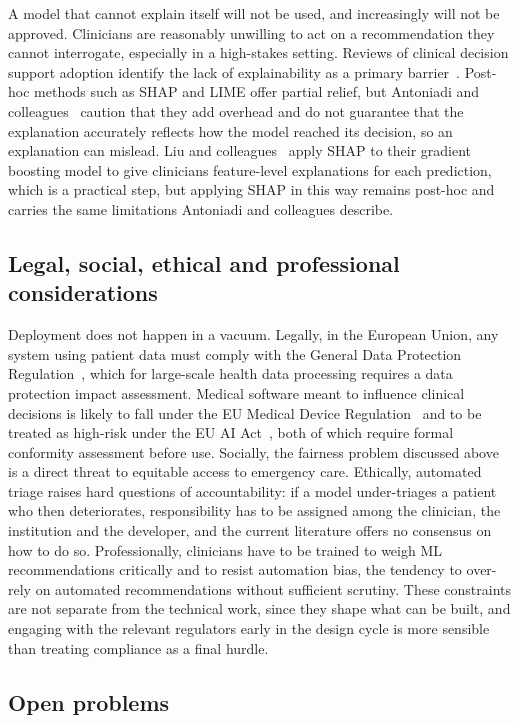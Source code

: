 \documentclass[11pt]{article}
\begin{document}
A model that cannot explain itself will not be used, and increasingly will not be approved. Clinicians are reasonably unwilling to act on a recommendation they cannot interrogate, especially in a high-stakes setting. Reviews of clinical decision support adoption identify the lack of explainability as a primary barrier~\cite{Antoniadi}. Post-hoc methods such as SHAP and LIME offer partial relief, but Antoniadi and colleagues~\cite{Antoniadi} caution that they add overhead and do not guarantee that the explanation accurately reflects how the model reached its decision, so an explanation can mislead. Liu and colleagues~\cite{Liu2025} apply SHAP to their gradient boosting model to give clinicians feature-level explanations for each prediction, which is a practical step, but applying SHAP in this way remains post-hoc and carries the same limitations Antoniadi and colleagues describe.

\subsection{Legal, social, ethical and professional considerations}

Deployment does not happen in a vacuum. Legally, in the European Union, any system using patient data must comply with the General Data Protection Regulation~\cite{GDPR}, which for large-scale health data processing requires a data protection impact assessment. Medical software meant to influence clinical decisions is likely to fall under the EU Medical Device Regulation~\cite{MDR} and to be treated as high-risk under the EU AI Act~\cite{AIAct}, both of which require formal conformity assessment before use. Socially, the fairness problem discussed above is a direct threat to equitable access to emergency care. Ethically, automated triage raises hard questions of accountability: if a model under-triages a patient who then deteriorates, responsibility has to be assigned among the clinician, the institution and the developer, and the current literature offers no consensus on how to do so. Professionally, clinicians have to be trained to weigh ML recommendations critically and to resist automation bias, the tendency to over-rely on automated recommendations without sufficient scrutiny. These constraints are not separate from the technical work, since they shape what can be built, and engaging with the relevant regulators early in the design cycle is more sensible than treating compliance as a final hurdle.

\subsection{Open problems}
\end{document}

